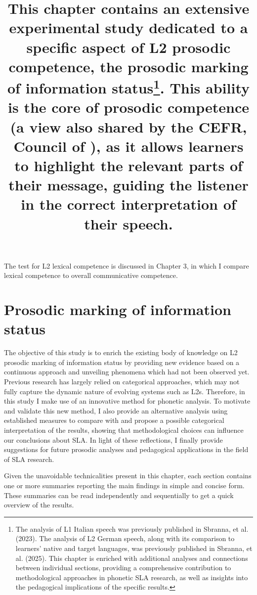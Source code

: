 The test for L2 lexical competence is discussed in Chapter 3, in which I compare lexical competence to overall communicative competence.

\section{Prosodic marking of information status} 
\hypertarget{Toc191305882}{}\title{\textmd{This chapter contains an extensive experimental study dedicated to a specific aspect of L2 prosodic competence, the} \textmd{prosodic marking of information status}\footnote{The analysis of L1 Italian speech was previously published in Sbranna, et al. (2023). The analysis of L2 German speech, along with its comparison to learners’ native and target languages, was previously published in Sbranna, et al. (2025). This chapter is enriched with additional analyses and connections between individual sections, providing a comprehensive contribution to methodological approaches in phonetic SLA research, as well as insights into the pedagogical implications of the specific results.}\textmd{. This ability is the core of prosodic competence} (a view also shared by the CEFR, Council of \citealt{Europe2020})\textmd{, as it allows learners to highlight the relevant parts of their message, guiding the listener in the correct interpretation of their speech.}}

The objective of this study is to enrich the existing body of knowledge on L2 prosodic marking of information status by providing new evidence based on a continuous approach and unveiling phenomena which had not been observed yet. Previous research has largely relied on categorical approaches, which may not fully capture the dynamic nature of evolving systems such as L2s. Therefore, in this study I make use of an innovative method for phonetic analysis. To motivate and validate this new method, I also provide an alternative analysis using established measures to compare with and propose a possible categorical interpretation of the results, showing that methodological choices can influence our conclusions about SLA. In light of these reflections, I finally provide suggestions for future prosodic analyses and pedagogical applications in the field of SLA research.

Given the unavoidable technicalities present in this chapter, each section contains one or more summaries reporting the main findings in simple and concise form. These summaries can be read independently and sequentially to get a quick overview of the results.

